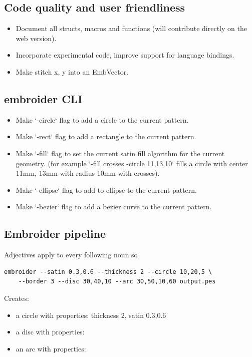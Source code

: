 \documentclass{report}
\begin{document}
\subsection{Code quality and user friendliness}

\begin{itemize}
\item Document all structs, macros and functions (will contribute directly
   on the web version).
\item Incorporate experimental code, improve support for language bindings.
\item Make stitch x, y into an EmbVector.
\end{itemize}

\subsection{embroider CLI}

\begin{itemize}
\item Make `-circle` flag to add a circle to the current pattern.
\item Make `-rect` flag to add a rectangle to the current pattern.
\item Make `-fill` flag to set the current satin fill algorithm for the current geometry. (for example `-fill crosses -circle 11,13,10` fills a circle with center 11mm, 13mm with radius 10mm with crosses).
\item Make `-ellipse` flag to add to ellipse to the current pattern.
\item Make `-bezier` flag to add a bezier curve to the current pattern.
\end{itemize}

\subsection{Embroider pipeline}

Adjectives apply to every following noun so

\begin{lstlisting}
embroider --satin 0.3,0.6 --thickness 2 --circle 10,20,5 \
    --border 3 --disc 30,40,10 --arc 30,50,10,60 output.pes
\end{lstlisting}

Creates:

\begin{itemize}
\item a circle with properties: thickness 2, satin 0.3,0.6
\item a disc with properties: 
\item an arc with properties:
\end{itemize}
\end{document}
